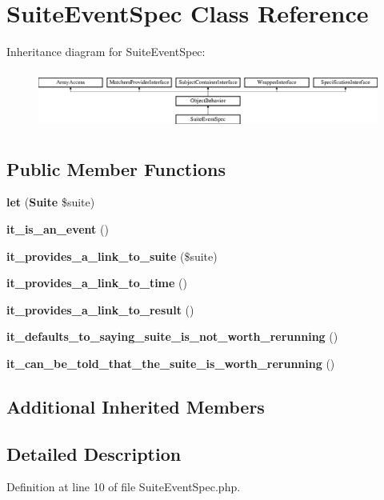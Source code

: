 \section{Suite\+Event\+Spec Class Reference}
\label{classspec_1_1_php_spec_1_1_event_1_1_suite_event_spec}
Inheritance diagram for Suite\+Event\+Spec\+:\begin{figure}[H]
\begin{center}
\leavevmode
\includegraphics[height=1.953488cm]{classspec_1_1_php_spec_1_1_event_1_1_suite_event_spec}
\end{center}
\end{figure}
\subsection*{Public Member Functions}
\begin{DoxyCompactItemize}
\item 
{\bf let} ({\bf Suite} \$suite)
\item 
{\bf it\+\_\+is\+\_\+an\+\_\+event} ()
\item 
{\bf it\+\_\+provides\+\_\+a\+\_\+link\+\_\+to\+\_\+suite} (\$suite)
\item 
{\bf it\+\_\+provides\+\_\+a\+\_\+link\+\_\+to\+\_\+time} ()
\item 
{\bf it\+\_\+provides\+\_\+a\+\_\+link\+\_\+to\+\_\+result} ()
\item 
{\bf it\+\_\+defaults\+\_\+to\+\_\+saying\+\_\+suite\+\_\+is\+\_\+not\+\_\+worth\+\_\+rerunning} ()
\item 
{\bf it\+\_\+can\+\_\+be\+\_\+told\+\_\+that\+\_\+the\+\_\+suite\+\_\+is\+\_\+worth\+\_\+rerunning} ()
\end{DoxyCompactItemize}
\subsection*{Additional Inherited Members}


\subsection{Detailed Description}


Definition at line 10 of file Suite\+Event\+Spec.\+php.



